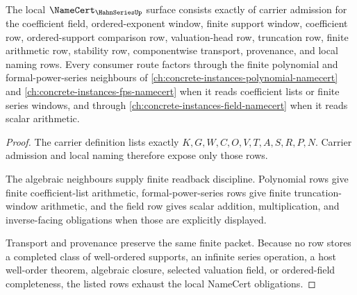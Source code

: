 \begin{theorem}
\label{thm:hahn-series-namecert-obligations}
The local $\NameCert_{\HahnSeriesUp}$ surface consists exactly of carrier admission for the coefficient field, ordered-exponent window, finite support window, coefficient row, ordered-support comparison row, valuation-head row, truncation row, finite arithmetic row, stability row, componentwise transport, provenance, and local naming rows. Every consumer route factors through the finite polynomial and formal-power-series neighbours of \autoref{ch:concrete-instances-polynomial-namecert} and \autoref{ch:concrete-instances-fps-namecert} when it reads coefficient lists or finite series windows, and through \autoref{ch:concrete-instances-field-namecert} when it reads scalar arithmetic.
\end{theorem}
\begin{proof}
The carrier definition lists exactly $K,G,W,C,O,V,T,A,S,R,P,N$. Carrier admission and local naming therefore expose only those rows.

The algebraic neighbours supply finite readback discipline. Polynomial rows give finite coefficient-list arithmetic, formal-power-series rows give finite truncation-window arithmetic, and the field row gives scalar addition, multiplication, and inverse-facing obligations when those are explicitly displayed.

Transport and provenance preserve the same finite packet. Because no row stores a completed class of well-ordered supports, an infinite series operation, a host well-order theorem, algebraic closure, selected valuation field, or ordered-field completeness, the listed rows exhaust the local NameCert obligations.
\end{proof}


\begin{closurestatus}{\HahnSeriesUp}
  \theoryclosure{\seedClosure}
  \formalstatus{\unformalizedV}
\end{closurestatus}
